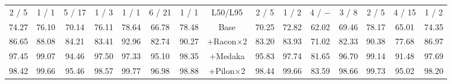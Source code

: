 \documentclass[a4paper,num-refs]{oup-contemporary}
\begin{document}
\begin{table}[t!]
\begin{tabular}{ccccccc|cc|ccccccc}
2 / 5   &       1 / 1   &       5 / 17  &       1 / 3   &       1 / 1   &       6 / 21  &       1 / 1   &       \multicolumn{2}{c|}{L50/L95}    &       2 / 5   &       1 / 2   &       4 / $-$ &       3 / 8   &       2 / 5   &       4 / 15  &       1 / 2\\
74.27   &       76.10   &       70.14   &       76.11   &       78.64   &       66.78   &       78.48   &       \multicolumn{2}{c|}{Base}       &       70.25   &       72.82   &       62.02   &       69.46   &       78.17   &       65.01   &       74.35\\
86.65   &       88.08   &       84.21   &       83.41   &       92.96   &       82.74   &       90.27   &       \multicolumn{2}{c|}{+Racon$\times$2}    &       83.20   &       83.93   &       71.02   &       82.33   &       90.38   &       77.68   &       86.97\\
97.45   &       99.07   &       94.46   &       97.50   &       97.33   &       95.10   &       98.35   &       \multicolumn{2}{c|}{+Medaka}    &       95.83   &       97.74   &       81.65   &       96.70   &       99.14   &       91.48   &       97.69\\
98.42   &       99.66   &       95.46   &       98.57   &       99.77   &       96.98   &       98.88   &       \multicolumn{2}{c|}{+Pilon$\times$2}    &       98.44   &       99.66   &       83.59   &       98.66   &       99.73   &       95.02   &       98.20\\
\midrule

\end{tabular}
\end{table}
\end{document}
